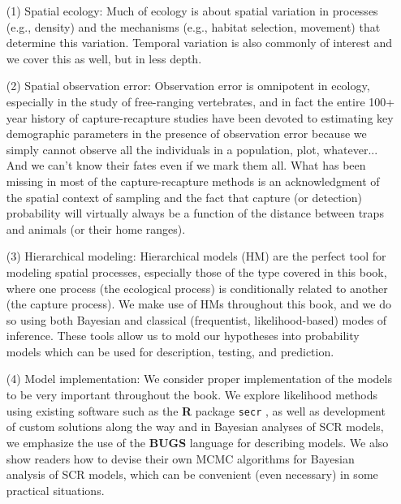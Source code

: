\begin{itemize}
\item[(1)]  Spatial ecology: Much of ecology is about spatial variation in
processes (e.g., density) and the mechanisms (e.g., habitat selection, movement) that
determine this variation. Temporal variation is also commonly of interest and
we cover this as well, but in less depth.

\item[(2)] Spatial observation error: Observation error is omnipotent in
ecology, especially in the study of free-ranging vertebrates, and in
fact the entire 100+ year history of capture-recapture studies have
been devoted to estimating key demographic parameters in the
presence of observation error because we simply cannot observe all
the individuals in a population, plot, whatever... And we can't know
their fates even if we mark them all. What has been missing in most
of the capture-recapture methods is an acknowledgment of the
spatial context of sampling and the fact that capture (or detection)
probability will virtually always be a function of the distance
between traps and animals (or their home ranges).

\item[(3)] Hierarchical modeling: Hierarchical models (HM) are the
  perfect tool for modeling spatial processes, especially those of the
  type covered in this book, where one process (the ecological
  process) is conditionally related to another (the capture
  process). We make use of HMs throughout this book, and we do so
  using both Bayesian and classical (frequentist, likelihood-based)
  modes of inference. These tools allow us to mold our hypotheses into
  probability models which can be used for description, testing, and
  prediction.


\item[(4)] Model implementation: We consider proper implementation of
  the models to be very important throughout the book.  We explore
  likelihood methods using existing software such as the {\bf R}
  package \mbox{\tt secr} \citep{efford:2011}, as well as development
  of custom solutions along the way and in Bayesian analyses of SCR
  models, we emphasize the use of the {\bf BUGS} language for
  describing models.  We also show readers how to devise their own
  MCMC algorithms for Bayesian analysis of SCR models, which can be
  convenient (even necessary) in some practical situations.

\end{itemize}

